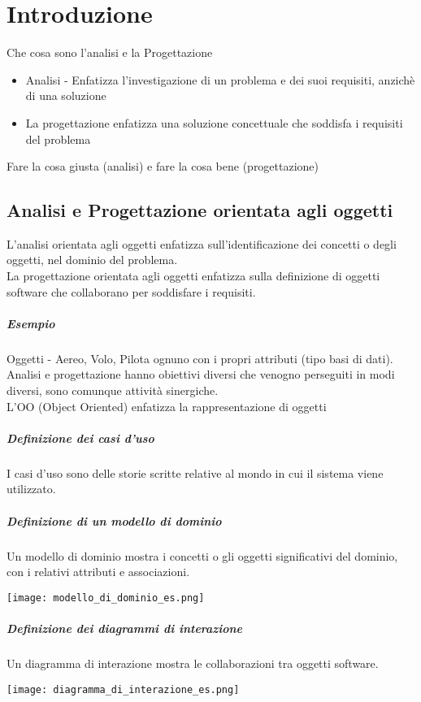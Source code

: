 \chapter{Introduzione}
Che cosa sono l'analisi e la Progettazione
\begin{itemize}
    \item Analisi - Enfatizza l'investigazione di un problema e dei suoi
    requisiti, anzichè di una soluzione
    \item La progettazione enfatizza una soluzione concettuale che soddisfa i requisiti
    del problema
\end{itemize}
Fare la cosa giusta (analisi) e fare la cosa bene (progettazione)
\section{Analisi e Progettazione orientata agli oggetti}
L'analisi orientata agli oggetti enfatizza sull'identificazione dei concetti o
degli oggetti, nel dominio del problema.
\\ La progettazione orientata agli oggetti enfatizza sulla definizione di oggetti
software che collaborano per soddisfare i requisiti.
\paragraph*{Esempio} Oggetti - Aereo, Volo, Pilota ognuno con i propri attributi
(tipo basi di dati).
Analisi e progettazione hanno obiettivi diversi che venogno perseguiti in modi diversi,
sono comunque attività sinergiche.
\\ L'OO (Object Oriented) enfatizza la rappresentazione di oggetti
\paragraph*{Definizione dei casi d'uso}
I casi d'uso sono delle storie scritte relative al mondo in cui il sistema
viene utilizzato.
\paragraph*{Definizione di un modello di dominio}
Un modello di dominio mostra i concetti o gli oggetti significativi del dominio,
con i relativi attributi e associazioni.
\begin{center}
\texttt{[image: modello\_di\_dominio\_es.png]}
\end{center}
\paragraph*{Definizione dei diagrammi di interazione}
Un diagramma di interazione mostra le collaborazioni tra oggetti software.
\begin{center}
    \texttt{[image: diagramma\_di\_interazione\_es.png]}
\end{center}
